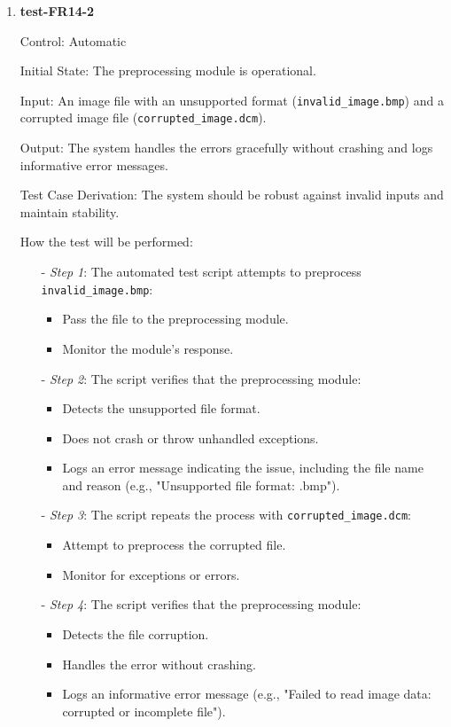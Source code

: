 \documentclass[12pt, titlepage]{article}
\begin{document}
\begin{enumerate}
\item \textbf{test-FR14-2} \label{test-FR14-2}

Control: Automatic

Initial State: The preprocessing module is operational.

Input: An image file with an unsupported format (\texttt{invalid\_image.bmp}) and a corrupted image file (\texttt{corrupted\_image.dcm}).

Output: The system handles the errors gracefully without crashing and logs informative error messages.

Test Case Derivation: The system should be robust against invalid inputs and maintain stability.

How the test will be performed:

\begin{itemize}
  \item[-] \textit{Step 1}: The automated test script attempts to preprocess \texttt{invalid\_image.bmp}:
    \begin{itemize}
      \item Pass the file to the preprocessing module.
      \item Monitor the module's response.
    \end{itemize}
  \item[-] \textit{Step 2}: The script verifies that the preprocessing module:
    \begin{itemize}
      \item Detects the unsupported file format.
      \item Does not crash or throw unhandled exceptions.
      \item Logs an error message indicating the issue, including the file name and reason (e.g., "Unsupported file format: .bmp").
    \end{itemize}
  \item[-] \textit{Step 3}: The script repeats the process with \texttt{corrupted\_image.dcm}:
    \begin{itemize}
      \item Attempt to preprocess the corrupted file.
      \item Monitor for exceptions or errors.
    \end{itemize}
  \item[-] \textit{Step 4}: The script verifies that the preprocessing module:
    \begin{itemize}
      \item Detects the file corruption.
      \item Handles the error without crashing.
      \item Logs an informative error message (e.g., "Failed to read image data: corrupted or incomplete file").
    \end{itemize}
\end{itemize}

\end{enumerate}
\end{document}
